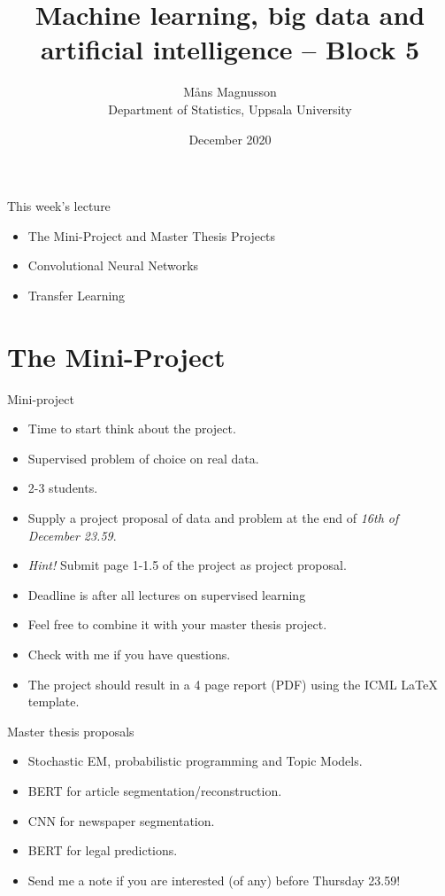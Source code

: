 \documentclass[10pt]{beamer}
\title[]{{\color{black}Machine learning, big data and artificial intelligence -- Block 5}}
\author[]{M{\aa}ns Magnusson\\Department of Statistics, Uppsala University}
\date{December 2020}
\begin{document}
\frame{\titlepage
}



\begin{frame}{This week's lecture}
\begin{itemize}
\item The Mini-Project and Master Thesis Projects
\item Convolutional Neural Networks
\item Transfer Learning
\end{itemize}
\end{frame}






\section{The Mini-Project}


\begin{frame}{Mini-project}

\begin{itemize}
\item Time to start think about the project.\pause
\item {\color{uured} Supervised} problem of choice on {\color{uured} real data}.\pause
\item 2-3 students.\pause
\item Supply a {\color{uured} project proposal} of data and problem at the end of \emph{16th of December 23.59}.
\item \emph{Hint!} Submit page 1-1.5 of the project as project proposal.
\item Deadline is after all lectures on supervised learning\pause
\item Feel free to combine it with your master thesis project.\pause
\item Check with me if you have questions.
\item The project should result in a 4 page report (PDF) using the {\color{uured} ICML LaTeX template}.
\end{itemize}
\end{frame}

\begin{frame}{Master thesis proposals}

\begin{itemize}
\item Stochastic EM, probabilistic programming and Topic Models.\pause
\item BERT for article segmentation/reconstruction.\pause
\item CNN for newspaper segmentation.\pause
\item BERT for legal predictions.\pause
\item Send me a note if you are interested (of any) before Thursday 23.59!
\end{itemize}

\end{frame}
\end{document}
